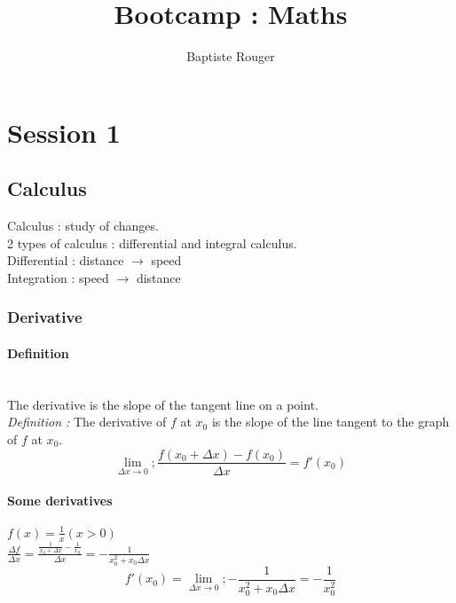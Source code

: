 \documentclass{article}
\title{Bootcamp : Maths}
\author{Baptiste Rouger}
\begin{document}
    \maketitle

    \tableofcontents

    \newpage

    \section{Session 1}


    \subsection{Calculus}

    Calculus : study of changes.\\

    2 types of calculus : differential and integral calculus.\\

    Differential : distance $\rightarrow$ speed\\
    Integration : speed $\rightarrow$ distance\\

    \subsubsection{Derivative}

    \paragraph{Definition}

    ~\\The derivative is the slope of the tangent line on a point.\\
    \textit{Definition :} The derivative of $f$ at $x_0$ is the slope of the line tangent to the graph of $f$ at $x_0$.\\
    \[ \lim_{\Delta x \to 0}; \frac{f(x_0 + \Delta x) - f(x_0)}{\Delta x} = f'(x_0) \]



    \paragraph{Some derivatives}
    $f(x) = \frac{1}{x} (x>0)  $\\
    $\frac{\Delta f}{\Delta x} =  \frac{\frac{1}{x_0 + \Delta x} - \frac{1}{x_0}}{\Delta x} = -\frac{1}{x_0^2 + x_0 \Delta x} $
    \[ f'(x_0) = \lim_{\Delta x \to 0}; -\frac{1}{x_0^2 + x_0 \Delta x} = -\frac{1}{x_0^2} \]
    ~\\~\\
\end{document}
